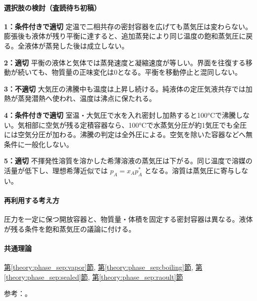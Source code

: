 \paragraph{選択肢の検討（査読待ち初稿）}\mbox{}\par

\noindent\textbf{1：条件付きで適切} 定温で二相共存の密封容器を広げても蒸気圧は変わらない。膨張後も液体が残り平衡に達すると、追加蒸発により同じ温度の飽和蒸気圧に戻る。全液体が蒸発した後は成立しない。\par

\noindent\textbf{2：適切} 平衡の液体と気体では蒸発速度と凝縮速度が等しい。界面を往復する移動が続いても、物質量の正味変化は0となる。平衡を移動停止と混同しない。\par

\noindent\textbf{3：不適切} 大気圧の沸騰中も温度は上昇し続ける。純液体の定圧気液共存では加熱が蒸発潜熱へ使われ、温度は沸点に保たれる。\par

\noindent\textbf{4：条件付きで適切} 室温・大気圧で水を入れ密封し加熱すると100°Cで沸騰しない。気相部に空気が残る定積容器なら、100°Cで水蒸気分圧が約1気圧でも全圧には空気分圧が加わる。沸騰の判定は全外圧による。空気を除いた容器などへ無条件に一般化しない。\par

\noindent\textbf{5：適切} 不揮発性溶質を溶かした希薄溶液の蒸気圧は下がる。同じ温度で溶媒の活量が低下し、理想希薄近似では \(p_A=x_Ap_A^*\) となる。溶質は蒸気圧に寄与しない。\par

\paragraph{再利用する考え方} 圧力を一定に保つ開放容器と、物質量・体積を固定する密封容器は異なる。液体が残る条件を飽和蒸気圧の議論に付ける。

\paragraph{共通理論} \hyperref[theory:phase_sep:vapor]{第\ref*{theory:phase_sep:vapor}節}, \hyperref[theory:phase_sep:boiling]{第\ref*{theory:phase_sep:boiling}節}, \hyperref[theory:phase_sep:sealed]{第\ref*{theory:phase_sep:sealed}節}, \hyperref[theory:phase_sep:raoult]{第\ref*{theory:phase_sep:raoult}節}

\par 参考：\cite{mit_solutions2008,mit_clapeyron2008}。

